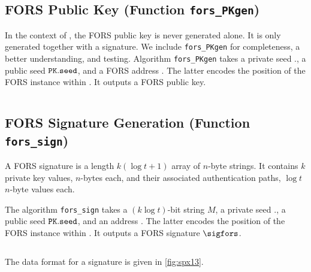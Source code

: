 \begin{algorithm}
    \inputminted[breaklines,linenos,tabsize=2,mathescape,escapeinside=||]{C}{paper/code/fors_treehash.cs}
    \caption{The \texttt{fors\_treehash algorithm.}}
    \label{alg:forstreehash}
\end{algorithm}

\subsection{FORS Public Key (Function \texttt{fors\_PKgen})}

In the context of \SPHINCSA, the FORS public key is never generated alone. It is only generated together with a signature. We include \texttt{fors\_PKgen} for completeness, a better understanding, and testing. Algorithm \texttt{fors\_PKgen} takes a private seed \sk.\seed, a public seed $\pk.\seed$, and a FORS address \ADRS. The latter encodes the position of the FORS instance within \SPHINCSA. It outputs a FORS public key.

\begin{algorithm}
    \inputminted[breaklines,linenos,tabsize=2,mathescape,escapeinside=||]{C}{paper/code/fors_PKgen.cs}
    \caption{\texttt{ fors\_PKgen } --- Generate a FORS public key. }
    \label{alg:forspkgen}
\end{algorithm}


\subsection{FORS Signature Generation (Function \texttt{fors\_sign})}

A FORS signature is a length $k(\log t+1)$ array of $n$-byte strings. It contains $k$ private key values, $n$-bytes each, and their associated authentication paths, $\log t$ $n$-byte values each.

The algorithm \texttt{fors\_sign} takes a $(k\log t)$-bit string $M$, a private seed \sk.\seed, a public seed $\pk.\seed$, and an address \ADRS. The latter encodes the position of the FORS instance within \SPHINCSA. It outputs a FORS signature $\sigfors$.

\begin{algorithm}
    \inputminted[breaklines,linenos,tabsize=2,mathescape,escapeinside=||]{C}{paper/code/fors_sign.cs}
    \caption{\texttt{ fors\_sign } --- Generate a FORS signature on string $M$. }
    \label{alg:forssign}
\end{algorithm}

The data format for a signature is given in \cref{fig:spx13}.

